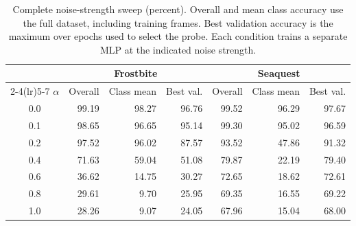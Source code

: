 \documentclass{article} %
\begin{document}
\begin{table}[!t]
\centering
\small
\setlength{\tabcolsep}{5pt}
\caption{Complete noise-strength sweep (percent). Overall and mean class accuracy use the full dataset, including training frames. Best validation accuracy is the maximum over epochs used to select the probe. Each condition trains a separate MLP at the indicated noise strength.}
\label{tab:noise_sweep_summary}
\begin{tabular}{crrrrrr}
\toprule
& \multicolumn{3}{c}{Frostbite} & \multicolumn{3}{c}{Seaquest} \\
\cmidrule(lr){2-4}\cmidrule(lr){5-7}
$\alpha$ & Overall & Class mean & Best val. & Overall & Class mean & Best val. \\
\midrule
0.0 & 99.19 & 98.27 & 96.76 & 99.52 & 96.29 & 97.67 \\
0.1 & 98.65 & 96.65 & 95.14 & 99.30 & 95.02 & 96.59 \\
0.2 & 97.52 & 96.02 & 87.57 & 93.52 & 47.86 & 91.32 \\
0.4 & 71.63 & 59.04 & 51.08 & 79.87 & 22.19 & 79.40 \\
0.6 & 36.62 & 14.75 & 30.27 & 72.65 & 18.62 & 72.61 \\
0.8 & 29.61 & 9.70 & 25.95 & 69.35 & 16.55 & 69.22 \\
1.0 & 28.26 & 9.07 & 24.05 & 67.96 & 15.04 & 68.00 \\
\bottomrule
\end{tabular}
\end{table}
\end{document}
